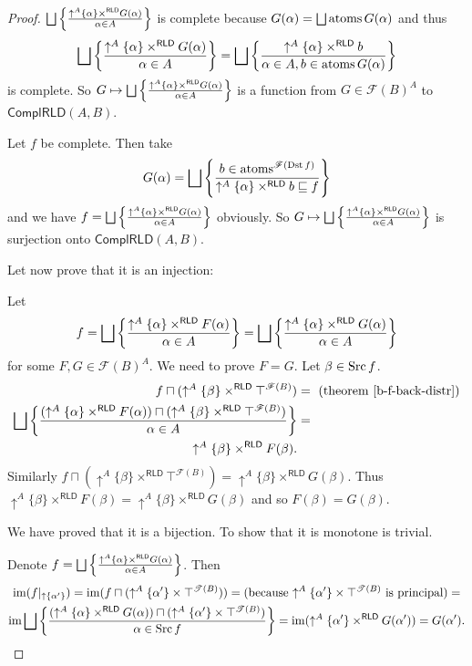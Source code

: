 \begin{proof}
$\bigsqcup\setcond{\uparrow^{A}\{\alpha\}\times^{\mathsf{RLD}}G(\alpha)}{\alpha\in A}$
is complete because $G(\alpha)=\bigsqcup\atoms G(\alpha)$ and thus
\[
\bigsqcup\setcond{\uparrow^{A}\{\alpha\}\times^{\mathsf{RLD}}G(\alpha)}{\alpha\in A}=\bigsqcup\setcond{\uparrow^{A}\{\alpha\}\times^{\mathsf{RLD}}b}{\alpha\in A,b\in\atoms G(\alpha)}
\]
is complete. So $G\mapsto\bigsqcup\setcond{\uparrow^{A}\{\alpha\}\times^{\mathsf{RLD}}G(\alpha)}{\alpha\in A}$
is a function from $G\in\mathscr{F}(B)^{A}$ to $\mathsf{ComplRLD}(A,B)$.

Let $f$ be complete. Then take
\[
G(\alpha)=\bigsqcup\setcond{b\in\atoms^{\mathscr{F}(\Dst f)}}{\uparrow^{A}\{\alpha\}\times^{\mathsf{RLD}}b\sqsubseteq f}
\]
and we have $f=\bigsqcup\setcond{\uparrow^{A}\{\alpha\}\times^{\mathsf{RLD}}G(\alpha)}{\alpha\in A}$
obviously. So $G\mapsto\bigsqcup\setcond{\uparrow^{A}\{\alpha\}\times^{\mathsf{RLD}}G(\alpha)}{\alpha\in A}$
is surjection onto $\mathsf{ComplRLD}(A,B)$.

Let now prove that it is an injection:

Let
\[
f=\bigsqcup\setcond{\uparrow^{A}\{\alpha\}\times^{\mathsf{RLD}}F(\alpha)}{\alpha\in A}=\bigsqcup\setcond{\uparrow^{A}\{\alpha\}\times^{\mathsf{RLD}}G(\alpha)}{\alpha\in A}
\]
for some $F,G\in\mathscr{F}(B)^{A}$. We need to prove $F=G$. Let
$\beta\in\operatorname{Src} f$.
\begin{align*}
f\sqcap(\uparrow^{A}\{\beta\}\times^{\mathsf{RLD}}\top^{\mathscr{F}(B)}) & =\text{ (theorem~\ref{b-f-back-distr})}\\
\bigsqcup\setcond{(\uparrow^{A}\{\alpha\}\times^{\mathsf{RLD}}F(\alpha))\sqcap(\uparrow^{A}\{\beta\}\times^{\mathsf{RLD}}\top^{\mathscr{F}(B)})}{\alpha\in A} & =\\
\uparrow^{A}\{\beta\}\times^{\mathsf{RLD}}F(\beta).
\end{align*}
Similarly $f\sqcap(\uparrow^{A}\{\beta\}\times^{\mathsf{RLD}}\top^{\mathscr{F}(B)})=\uparrow^{A}\{\beta\}\times^{\mathsf{RLD}}G(\beta)$.
Thus $\uparrow^{A}\{\beta\}\times^{\mathsf{RLD}}F(\beta)=\uparrow^{A}\{\beta\}\times^{\mathsf{RLD}}G(\beta)$
and so $F(\beta)=G(\beta)$.

We have proved that it is a bijection. To show that it is monotone
is trivial.

Denote $f=\bigsqcup\setcond{\uparrow^{A}\{\alpha\}\times^{\mathsf{RLD}}G(\alpha)}{\alpha\in A}$.
Then
\begin{multline*}
\im(f|_{\uparrow \{\alpha'\}})=\im(f\sqcap(\uparrow^{A}\{\alpha'\}\times\top^{\mathscr{T}(B)}))=\text{(because \ensuremath{\uparrow^{A}\{\alpha'\}\times\top^{\mathscr{T}(B)}} is principal)}=\\
\im\bigsqcup\setcond{(\uparrow^{A}\{\alpha\}\times^{\mathsf{RLD}}G(\alpha))\sqcap(\uparrow^{A}\{\alpha'\}\times\top^{\mathscr{T}(B)})}{\alpha\in\Src f}=\im(\uparrow^{A}\{\alpha'\}\times^{\mathsf{RLD}}G(\alpha'))=G(\alpha').
\end{multline*}
\end{proof}
